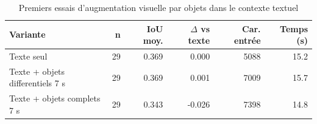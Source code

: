 \begin{table}[ht]
\centering
\footnotesize
\caption{Premiers essais d'augmentation visuelle par objets dans le contexte textuel}
\label{tab:llm-object-augmentation}
\begin{tabularx}{\textwidth}{>{\raggedright\arraybackslash}Xrrrrr}
\toprule
Variante & n & IoU moy. & $\Delta$ vs texte & Car. entr\'ee & Temps (s) \\
\midrule
Texte seul & 29 & 0.369 & 0.000 & 5088 & 15.2 \\
Texte + objets differentiels 7 s & 29 & 0.369 & 0.001 & 7009 & 15.7 \\
Texte + objets complets 7 s & 29 & 0.343 & -0.026 & 7398 & 14.8 \\
\bottomrule
\end{tabularx}
\end{table}
